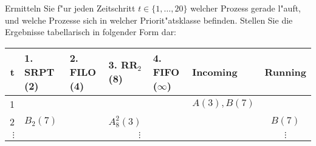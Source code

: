 Ermitteln Sie f"ur jeden Zeitschritt $t \in \{1, \dots, 20\}$ welcher
Prozess gerade l"auft, und welche Prozesse sich in welcher
Priorit"atsklasse befinden.  Stellen Sie die Ergebnisse tabellarisch in
folgender Form dar:

\begin{center}
  \begin{tabular}{rlllllc}
    \toprule
    t  & 1. SRPT (2) & 2. FILO (4)      & 3. RR${}_2$ (8)    & 4. FIFO ($\infty$) & Incoming     & Running \\
    \midrule
    1  &             &                  &                    &                    & $A(3), B(7)$ & \\
    2  & $B_2(7)$    &                  & $A_8^2(3)$         &                    &              & $B(7)$ \\
    $\vdots$ & \multicolumn{5}{c}{$\vdots$} & $\vdots$ \\
    \bottomrule
  \end{tabular}
\end{center}
